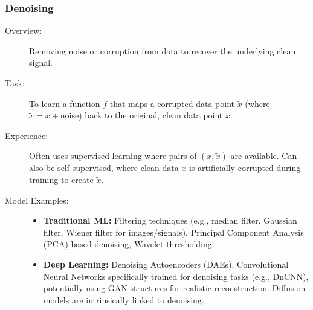 \documentclass{article}
\begin{document}
\subsubsection{Denoising}
\begin{description}
    \item[Overview:] Removing noise or corruption from data to recover the underlying clean signal.
    \item[Task:] To learn a function $f$ that maps a corrupted data point $\tilde{x}$ (where $\tilde{x} = x + \text{noise}$) back to the original, clean data point $x$.
    \item[Experience:] Often uses supervised learning where pairs of $(x, \tilde{x})$ are available. Can also be self-supervised, where clean data $x$ is artificially corrupted during training to create $\tilde{x}$.
    \item[Model Examples:]
        \begin{itemize}
            \item \textbf{Traditional ML:} Filtering techniques (e.g., median filter, Gaussian filter, Wiener filter for images/signals), Principal Component Analysis (PCA) based denoising, Wavelet thresholding.
            \item \textbf{Deep Learning:} Denoising Autoencoders (DAEs), Convolutional Neural Networks specifically trained for denoising tasks (e.g., DnCNN), potentially using GAN structures for realistic reconstruction. Diffusion models are intrinsically linked to denoising.
        \end{itemize}
\end{description}
\end{document}
